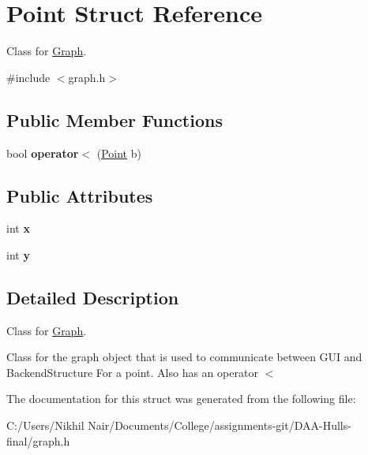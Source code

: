 \hypertarget{struct_point}{}\section{Point Struct Reference}
\label{struct_point}


Class for \mbox{\hyperlink{class_graph}{Graph}}.  




{\ttfamily \#include $<$graph.\+h$>$}

\subsection*{Public Member Functions}
\begin{DoxyCompactItemize}
\item 
\mbox{\label{struct_point_a779d9218c12929c17afdec20d08e6623}} 
bool {\bfseries operator$<$} (\mbox{\hyperlink{struct_point}{Point}} b)
\end{DoxyCompactItemize}
\subsection*{Public Attributes}
\begin{DoxyCompactItemize}
\item 
\mbox{\label{struct_point_a8c779e11e694b20e0946105a9f5de842}} 
int {\bfseries x}
\item 
\mbox{\label{struct_point_a2e1b5fb2b2a83571f5c0bc0f66a73cf7}} 
int {\bfseries y}
\end{DoxyCompactItemize}


\subsection{Detailed Description}
Class for \mbox{\hyperlink{class_graph}{Graph}}. 

Class for the graph object that is used to communicate between G\+UI and Backend\+Structure For a point. Also has an operator $<$ 

The documentation for this struct was generated from the following file\+:\begin{DoxyCompactItemize}
\item 
C\+:/\+Users/\+Nikhil Nair/\+Documents/\+College/assignments-\/git/\+D\+A\+A-\/\+Hulls-\/final/graph.\+h\end{DoxyCompactItemize}

